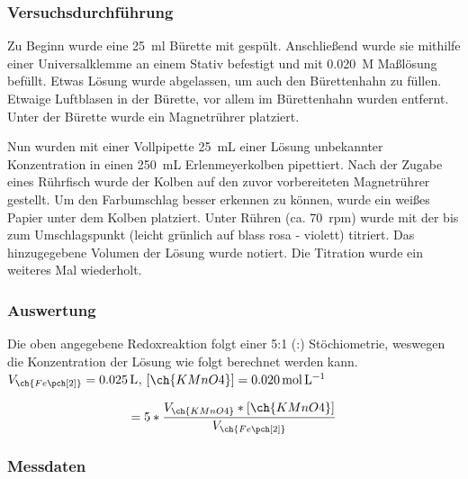 \documentclass{article}
\begin{document}
      \subsubsection{Versuchsdurchführung} \label{sec:VersuchFe}
        
        Zu Beginn wurde eine \SI[mode=text,separate-uncertainty=true]{25}{\milli\litre} Bürette mit  gespült. Anschließend wurde sie mithilfe einer Universalklemme an einem Stativ befestigt und mit \SI[mode=text]{0.020}{M}  Maßlösung befüllt. Etwas Lösung wurde abgelassen, um auch den Bürettenhahn zu füllen. Etwaige Luftblasen in der Bürette, vor allem im Bürettenhahn wurden entfernt. Unter der Bürette wurde ein Magnetrührer platziert. 
        
        Nun wurden mit einer Vollpipette \SI[mode=text]{25}{\milli\liter} einer  Lösung unbekannter Konzentration in einen \SI[mode=text]{250}{\milli\liter} Erlenmeyerkolben pipettiert. Nach der Zugabe eines Rührfisch wurde der Kolben auf den zuvor vorbereiteten Magnetrührer gestellt. Um den Farbumschlag besser erkennen zu können, wurde ein weißes Papier unter dem Kolben platziert.  Unter Rühren (ca. \SI[mode=text]{70}{rpm}) wurde mit der  bis zum Umschlagspunkt (leicht grünlich auf blass rosa - violett) titriert. Das hinzugegebene Volumen der  Lösung wurde notiert. Die Titration wurde ein weiteres Mal wiederholt.
        
      \subsubsection{Auswertung}
        
        Die oben angegebene Redoxreaktion folgt einer 5:1 (:) Stöchiometrie, weswegen die Konzentration der  Lösung wie folgt berechnet werden kann. $V_{\ch{Fe\pch[2]}} = \SI[mode=text]{0.025}{\liter}$, $[\ch{KMnO4}] = \SI[mode=text]{0.020}{\mole\per\liter}$
        
        \begin{equation}
           [\ch{Fe\pch[2]\aq}] = 5 * \frac{V_{\ch{KMnO4}} * [\ch{KMnO4}]}{V_{\ch{Fe\pch[2]}}} \label{eq:Mn}
         \end{equation}
         
      \subsubsection{Messdaten}
        
\end{document}
